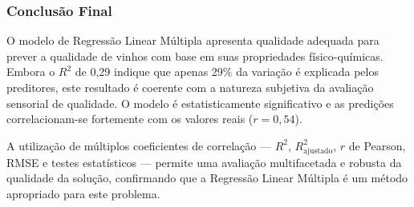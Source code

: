 \documentclass[12pt,a4paper]{article}
\begin{document}
\subsubsection*{Conclusão Final}

O modelo de Regressão Linear Múltipla apresenta qualidade adequada para prever a qualidade de vinhos com base em suas propriedades físico-químicas. Embora o $R^2$ de 0,29 indique que apenas 29\% da variação é explicada pelos preditores, este resultado é coerente com a natureza subjetiva da avaliação sensorial de qualidade. O modelo é estatisticamente significativo e as predições correlacionam-se fortemente com os valores reais ($r = 0,54$).

A utilização de múltiplos coeficientes de correlação — $R^2$, $R^2_{\text{ajustado}}$, $r$ de Pearson, RMSE e testes estatísticos — permite uma avaliação multifacetada e robusta da qualidade da solução, confirmando que a Regressão Linear Múltipla é um método apropriado para este problema.
\end{document}
